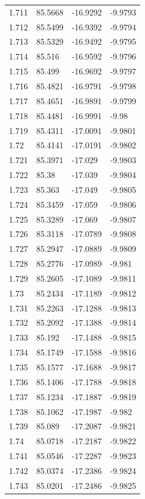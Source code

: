 \begin{tabular}{llll}
1.711 & 85.5668 & -16.9292 & -9.9793 \\
1.712 & 85.5499 & -16.9392 & -9.9794 \\
1.713 & 85.5329 & -16.9492 & -9.9795 \\
1.714 & 85.516 & -16.9592 & -9.9796 \\
1.715 & 85.499 & -16.9692 & -9.9797 \\
1.716 & 85.4821 & -16.9791 & -9.9798 \\
1.717 & 85.4651 & -16.9891 & -9.9799 \\
1.718 & 85.4481 & -16.9991 & -9.98 \\
1.719 & 85.4311 & -17.0091 & -9.9801 \\
1.72 & 85.4141 & -17.0191 & -9.9802 \\
1.721 & 85.3971 & -17.029 & -9.9803 \\
1.722 & 85.38 & -17.039 & -9.9804 \\
1.723 & 85.363 & -17.049 & -9.9805 \\
1.724 & 85.3459 & -17.059 & -9.9806 \\
1.725 & 85.3289 & -17.069 & -9.9807 \\
1.726 & 85.3118 & -17.0789 & -9.9808 \\
1.727 & 85.2947 & -17.0889 & -9.9809 \\
1.728 & 85.2776 & -17.0989 & -9.981 \\
1.729 & 85.2605 & -17.1089 & -9.9811 \\
1.73 & 85.2434 & -17.1189 & -9.9812 \\
1.731 & 85.2263 & -17.1288 & -9.9813 \\
1.732 & 85.2092 & -17.1388 & -9.9814 \\
1.733 & 85.192 & -17.1488 & -9.9815 \\
1.734 & 85.1749 & -17.1588 & -9.9816 \\
1.735 & 85.1577 & -17.1688 & -9.9817 \\
1.736 & 85.1406 & -17.1788 & -9.9818 \\
1.737 & 85.1234 & -17.1887 & -9.9819 \\
1.738 & 85.1062 & -17.1987 & -9.982 \\
1.739 & 85.089 & -17.2087 & -9.9821 \\
1.74 & 85.0718 & -17.2187 & -9.9822 \\
1.741 & 85.0546 & -17.2287 & -9.9823 \\
1.742 & 85.0374 & -17.2386 & -9.9824 \\
1.743 & 85.0201 & -17.2486 & -9.9825 \\

\end{tabular}
